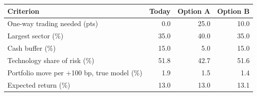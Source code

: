 \begin{tabular}{@{}lrrr@{}}
\toprule
\textbf{Criterion} & \textbf{Today} & \textbf{Option A} & \textbf{Option B} \\
\midrule
One-way trading needed (pts) & 0.0 & 25.0 & 10.0 \\
Largest sector (\%) & 35.0 & 40.0 & 35.0 \\
Cash buffer (\%) & 15.0 & 5.0 & 15.0 \\
Technology share of risk (\%) & 51.8 & 42.7 & 51.6 \\
Portfolio move per +100 bp, true model (\%) & \textminus{}1.9 & \textminus{}1.5 & \textminus{}1.4 \\
Expected return (\%) & 13.0 & 13.0 & 13.1 \\
\bottomrule
\end{tabular}